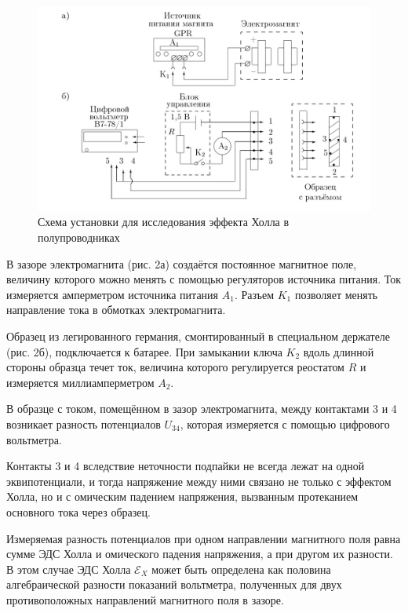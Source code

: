\documentclass[a4paper,12pt]{article}
\begin{document}
	\begin{figure}[h!]
		\centering
		\includegraphics[scale = 0.35]{Holl2}
		\caption{Схема установки для исследования эффекта Холла в полупроводниках}
		\label{fig:Holl2}
	\end{figure}
  
  	В зазоре электромагнита (рис. 2а) создаётся постоянное магнитное поле, величину которого можно менять с помощью регуляторов источника питания. Ток измеряется амперметром источника питания $A_{1}$. Разъем $K_{1}$ позволяет менять направление тока в обмотках электромагнита.
  
  	Образец из легированного германия, смонтированный в специальном держателе (рис. 2б), подключается к батарее. При замыкании ключа $K_{2}$ вдоль длинной стороны образца течет ток, величина которого регулируется реостатом $R$ и измеряется миллиамперметром $A_2$.
  	
  	В образце с током, помещённом в зазор электромагнита, между контактами 3 и 4 возникает разность потенциалов $U_{34}$, которая измеряется с помощью цифрового вольтметра.
  	
  	Контакты 3 и 4 вследствие неточности подпайки не всегда лежат на одной
  	эквипотенциали, и тогда напряжение между ними связано не только с эффектом
  	Холла, но и с омическим падением напряжения, вызванным протеканием основного тока через образец.
  	
  	Измеряемая разность потенциалов при одном направлении
  	магнитного поля равна сумме ЭДС Холла и омического падения напряжения, а
  	при другом  их разности. В этом случае ЭДС Холла $\mathscr{E}_{X}$ может быть определена как половина алгебраической разности показаний вольтметра, полученных для
  	двух противоположных направлений магнитного поля в зазоре.
  	
\end{document}
